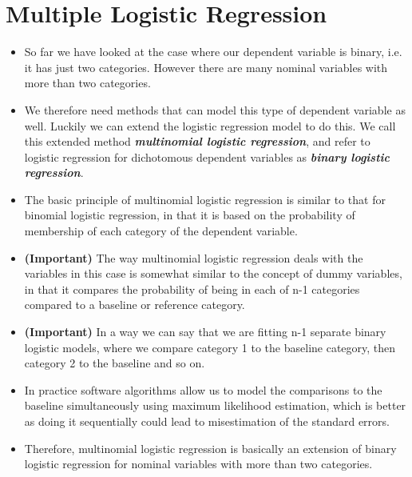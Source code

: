 \documentclass[a4paper,12pt]{article}
\begin{document}
%





\section*{Multiple Logistic Regression}
\begin{itemize}
	\item So far we have looked at the case where our dependent variable is binary, i.e. it has just two categories. However there are many nominal variables with more than two categories. 
	
	
	\item We therefore need methods that can model this type of dependent variable as well. Luckily we can extend the logistic regression model to do this. We call this extended method \textbf{\textit{multinomial logistic regression}}, and refer to logistic regression for dichotomous dependent variables as \textbf{\textit{binary logistic regression}}.
	
	\item The basic principle of multinomial logistic regression is similar to that for binomial logistic regression, in that it is based on the probability of membership of each category of the dependent variable.
	
	
	\item \textbf{(Important)} The way multinomial logistic regression deals with the variables in this case is somewhat similar to the concept of dummy variables, in that it compares the probability of being in each of n-1 categories compared to a baseline or reference category. 
	\item \textbf{(Important)} In a way we can say that we are fitting n-1 separate binary logistic models, where we compare category 1 to the baseline category, then category 2 to the baseline and so on. 
	\item In practice software algorithms allow us to model the comparisons to the baseline simultaneously using maximum likelihood estimation, which is better as doing it sequentially could lead to misestimation of the standard errors. 
	\item Therefore, multinomial logistic regression is basically an extension of binary logistic regression for nominal variables with more than two categories.
\end{itemize}
\end{document}
